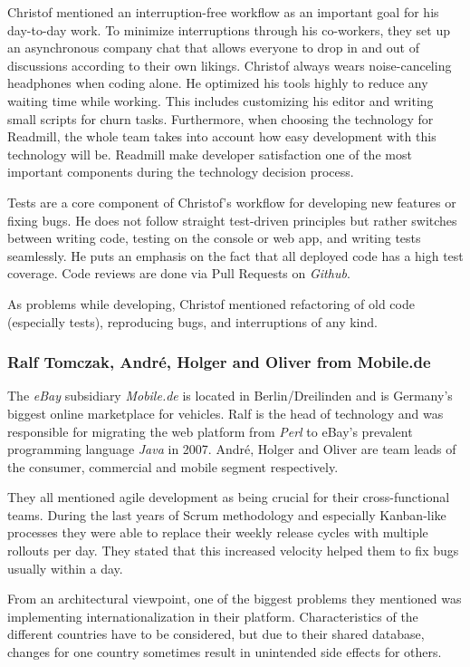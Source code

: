 Christof mentioned an interruption-free workflow as an important goal for his day-to-day work. To minimize interruptions through his co-workers, they set up an asynchronous company chat that allows everyone to drop in and out of discussions according to their own likings. Christof always wears noise-canceling headphones when coding alone. He optimized his tools highly to reduce any waiting time while working. This includes customizing his editor and writing small scripts for churn tasks. Furthermore, when choosing the technology for Readmill, the whole team takes into account how easy development with this technology will be. Readmill make developer satisfaction one of the most important components during the technology decision process.

Tests are a core component of Christof's workflow for developing new features or fixing bugs. He does not follow straight test-driven principles but rather switches between writing code, testing on the console or web app, and writing tests seamlessly. He puts an emphasis on the fact that all deployed code has a high test coverage. Code reviews are done via Pull Requests on \emph{Github}.

As problems while developing, Christof mentioned refactoring of old code (especially tests), reproducing bugs, and interruptions of any kind.

\subsubsection{Ralf Tomczak, Andr\'e, Holger and Oliver from Mobile.de}
The \emph{eBay} subsidiary \emph{Mobile.de} is located in Berlin/Dreilinden and is Germany's biggest online marketplace for vehicles. Ralf is the head of technology and was responsible for migrating the web platform from \emph{Perl} to eBay's prevalent programming language \emph{Java} in 2007. Andr\'e, Holger and Oliver are team leads of the consumer, commercial and mobile segment respectively.

They all mentioned agile development as being crucial for their cross-functional teams. During the last years of Scrum methodology and especially Kanban-like processes they were able to replace their weekly release cycles with multiple rollouts per day. They stated that this increased velocity helped them to fix bugs usually within a day.

From an architectural viewpoint, one of the biggest problems they mentioned was implementing internationalization in their platform. Characteristics of the different countries have to be considered, but due to their shared database, changes for one country sometimes result in unintended side effects for others.

